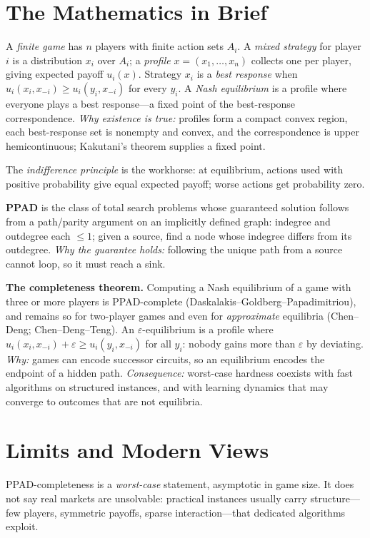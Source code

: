 \section{The Mathematics in Brief}

A \emph{finite game} has $n$ players with finite action sets $A_i$. A \emph{mixed strategy} for player $i$ is a distribution $x_i$ over $A_i$; a \emph{profile} $x=(x_1,\dots,x_n)$ collects one per player, giving expected payoff $u_i(x)$. Strategy $x_i$ is a \emph{best response} when $u_i(x_i,x_{-i})\ge u_i(y_i,x_{-i})$ for every $y_i$. A \emph{Nash equilibrium} is a profile where everyone plays a best response---a fixed point of the best-response correspondence. \emph{Why existence is true:} profiles form a compact convex region, each best-response set is nonempty and convex, and the correspondence is upper hemicontinuous; Kakutani's theorem supplies a fixed point.

The \emph{indifference principle} is the workhorse: at equilibrium, actions used with positive probability give equal expected payoff; worse actions get probability zero.

\textbf{PPAD} is the class of total search problems whose guaranteed solution follows from a path/parity argument on an implicitly defined graph: indegree and outdegree each $\le1$; given a source, find a node whose indegree differs from its outdegree. \emph{Why the guarantee holds:} following the unique path from a source cannot loop, so it must reach a sink.

\textbf{The completeness theorem.} Computing a Nash equilibrium of a game with three or more players is PPAD-complete (Daskalakis--Goldberg--Papadimitriou), and remains so for two-player games and even for \emph{approximate} equilibria (Chen--Deng; Chen--Deng--Teng). An $\varepsilon$-equilibrium is a profile where $u_i(x_i,x_{-i})+\varepsilon\ge u_i(y_i,x_{-i})$ for all $y_i$: nobody gains more than $\varepsilon$ by deviating. \emph{Why:} games can encode successor circuits, so an equilibrium encodes the endpoint of a hidden path. \emph{Consequence:} worst-case hardness coexists with fast algorithms on structured instances, and with learning dynamics that may converge to outcomes that are not equilibria.

\section{Limits and Modern Views}

PPAD-completeness is a \emph{worst-case} statement, asymptotic in game size. It does not say real markets are unsolvable: practical instances usually carry structure---few players, symmetric payoffs, sparse interaction---that dedicated algorithms exploit.

